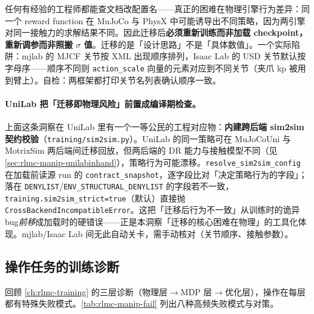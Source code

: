 \begin{insight}\label{ins:rlmc-manip-bridge}
任何有经验的工程师都能查文档改配置名——真正的困难在物理引擎行为差异：同一个 reward function 在 MuJoCo 与 PhysX 中可能诱导出不同策略，因为两引擎对同一接触力的求解结果不同。因此迁移后\textbf{必须重新训练而非加载 checkpoint，重新调参而非照搬 $\sigma$ 值}。迁移的是「设计思路」不是「具体数值」。一个实际陷阱：mjlab 的 MJCF 关节按 XML 出现顺序排列，Isaac Lab 的 USD 关节默认按字母序——顺序不同则 \verb|action_scale| 向量的元素对应到不同关节（夹爪 kp 被用到臂上）。自检：两框架都打印关节名列表确认顺序一致。
\end{insight}

\paragraph{UniLab 把「迁移即物理风险」前置成编译期检查。}上面这条洞察在 UniLab 里有一个一等公民的工程对应物：\textbf{内建跨后端 sim2sim 契约校验}（\verb|training/sim2sim.py|）。UniLab 的同一策略可在 MuJoCoUni 与 MotrixSim 两后端间迁移回放，但两后端的 DR 能力与接触模型不同（见 \cref{sec:rlmc-manip-unilabinhand}），策略行为可能漂移。\verb|resolve_sim2sim_config| 在加载前读源 run 的 \verb|contract_snapshot|，逐字段比对「决定策略行为的字段」；落在 \verb|DENYLIST|/\verb|ENV_STRUCTURAL_DENYLIST| 的字段若不一致，\verb|training.sim2sim_strict=true|（默认）直接抛 \verb|CrossBackendIncompatibleError|。这把「迁移后行为不一致」从训练时的诡异 bug\emph{前移}成加载时的硬错误——正是本洞察「迁移的核心困难在物理」的工具化体现。mjlab/Isaac Lab 间无此自动关卡，需手动核对（关节顺序、接触参数）。

\subsection{操作任务的训练诊断}
\label{sec:rlmc-manip-diag}

回顾 \cref{ch:rlmc-training} 的三层诊断（物理层$\to$MDP 层$\to$优化层），操作在每层都有特殊失败模式。\cref{tab:rlmc-manip-fail} 列出八种高频失败模式与对策。

